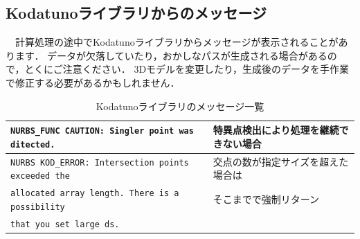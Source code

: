 \subsection{Kodatunoライブラリからのメッセージ}
　計算処理の途中でKodatunoライブラリからメッセージが表示されることがあります．
データが欠落していたり，おかしなパスが生成される場合があるので，とくにご注意ください．
3Dモデルを変更したり，生成後のデータを手作業で修正する必要があるかもしれません．

\begin{table}[H]
\centering
\caption{Kodatunoライブラリのメッセージ一覧}
\label{tab:kodatuno_msg}
\begin{tabular}{l|l}
\hline
\texttt{NURBS\_FUNC CAUTION: Singler point was ditected.} & 特異点検出により処理を継続できない場合 \\ \hline
\texttt{NURBS KOD\_ERROR: Intersection points exceeded the} & 交点の数が指定サイズを超えた場合は \\
\texttt{allocated array length. There is a possibility} & そこまでで強制リターン \\
\texttt{that you set large ds.} & \\ \hline
\end{tabular}
\end{table}
